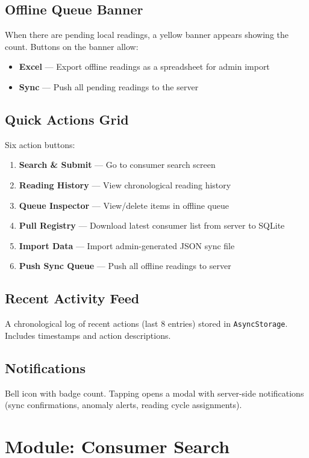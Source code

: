 \documentclass[12pt, a4paper]{report}
\newenvironment{featurelist}{%
    \begin{itemize}[leftmargin=1.5em, itemsep=2pt, parsep=0pt]
}{%
    \end{itemize}
}
\begin{document}
\subsection{Offline Queue Banner}
When there are pending local readings, a yellow banner appears showing the count. Buttons on the banner allow:
\begin{featurelist}
    \item \textbf{Excel} — Export offline readings as a spreadsheet for admin import
    \item \textbf{Sync} — Push all pending readings to the server
\end{featurelist}

\subsection{Quick Actions Grid}
Six action buttons:
\begin{enumerate}[leftmargin=1.8em]
    \item \textbf{Search \& Submit} — Go to consumer search screen
    \item \textbf{Reading History} — View chronological reading history
    \item \textbf{Queue Inspector} — View/delete items in offline queue
    \item \textbf{Pull Registry} — Download latest consumer list from server to SQLite
    \item \textbf{Import Data} — Import admin-generated JSON sync file
    \item \textbf{Push Sync Queue} — Push all offline readings to server
\end{enumerate}

\subsection{Recent Activity Feed}
A chronological log of recent actions (last 8 entries) stored in \texttt{AsyncStorage}. Includes timestamps and action descriptions.

\subsection{Notifications}
Bell icon with badge count. Tapping opens a modal with server-side notifications (sync confirmations, anomaly alerts, reading cycle assignments).

\section{Module: Consumer Search}
\end{document}
